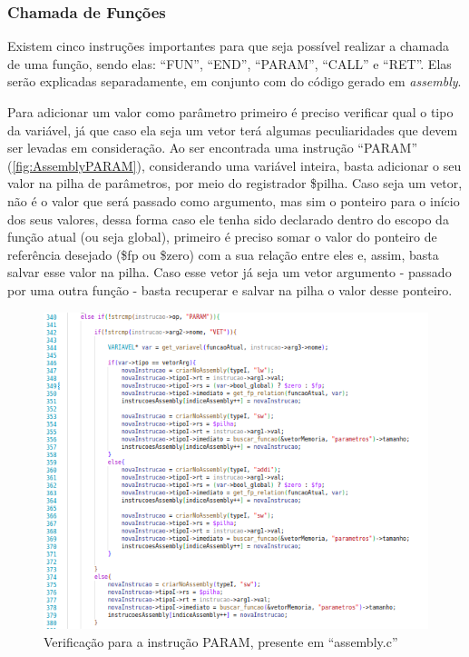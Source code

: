 \documentclass[
	12pt,				%
	oneside,
	a4paper,			%
	english,			%
	french,				%
	spanish,			%
	brazil,				%
	]{abntex2}
\begin{document}
\subsubsection{Chamada de Funções}

Existem cinco instruções importantes para que seja possível realizar a chamada de uma função, sendo elas: ``FUN'', ``END'', ``PARAM'', ``CALL'' e ``RET''. Elas serão explicadas separadamente, em conjunto com do código gerado em \emph{assembly}.

Para adicionar um valor como parâmetro primeiro é preciso verificar qual o tipo da variável, já que caso ela seja um vetor terá algumas peculiaridades que devem ser levadas em consideração. Ao ser encontrada uma instrução ``PARAM'' (\autoref{fig:AssemblyPARAM}), considerando uma variável inteira, basta adicionar o seu valor na pilha de parâmetros, por meio do registrador \$pilha. Caso seja um vetor, não é o valor que será passado como argumento, mas sim o ponteiro para o início dos seus valores, dessa forma caso ele tenha sido declarado dentro do escopo da função atual (ou seja global), primeiro é preciso somar o valor do ponteiro de referência desejado (\$fp ou \$zero) com a sua relação entre eles e, assim, basta salvar esse valor na pilha. Caso esse vetor já seja um vetor argumento - passado por uma outra função - basta recuperar e salvar na pilha o valor desse ponteiro.

\begin{figure}[H]
\centering 
\caption{Verificação para a instrução PARAM, presente em \nohyphens{``assembly.c''}} 
\label{fig:AssemblyPARAM}
\graphicspath{ {./imgs/} } 
\includegraphics[scale=0.5]{imgs/Codigo/Assembly_Param.png}
\end{figure}
\end{document}
